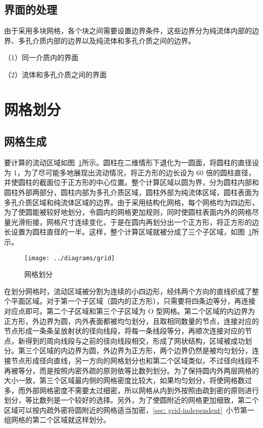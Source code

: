 \subsection{界面的处理}

由于采用多块网格，各个块之间需要设置边界条件，这些边界分为纯流体内部的边界、多孔介质内部的边界以及纯流体和多孔介质之间的边界。

（1）同一介质内的界面

（2）流体和多孔介质之间的界面

\section{网格划分}

\subsection{网格生成}

要计算的流动区域如图~\ref{fig: grid}所示。圆柱在二维情形下退化为一圆面，将圆柱的直径设为 1，为了尽可能多地展现出流动情况，将正方形的边长设为 60 倍的圆柱直径，并使圆柱的截面位于正方形的中心位置。整个计算区域以圆为界，分为圆柱内部和圆柱外部两部分，圆柱内部为多孔介质区域，圆柱外部为纯流体区域，圆柱表面为多孔介质区域和纯流体区域的边界。由于采用结构化网格，每个网格均为四边形，为了使圆能被较好地划分，令圆内的网格更加规则，同时使圆柱表面内外的网格尽量光滑衔接，网格尺寸连续变化，于是在圆内再划分出一个正方形，将正方形的边长设置为圆柱直径的一半。这样，整个计算区域就被分成了三个子区域，如图~\ref{fig: grid}所示。

\begin{figure}
	\centering
	\texttt{[image: ../diagrams/grid]}
	\caption{网格划分}\label{fig: grid}
\end{figure}

在划分网格时，流动区域被分割为连续的小四边形，经纬两个方向的直线织成了整个平面区域。对于第一个子区域（圆内的正方形），只需要将四条边等分，再连接对应点即可。第二个子区域和第三个子区域为 O 型网格。第二个区域的内边界为正方形，外边界为圆，内外表面都被均匀划分，且取相同数量的节点，连接对应的节点形成一条条呈放射状的径向线段，将每一条线段等分，再顺次连接对应的节点，新得到的周向线段与之前的径向线段相交，形成了网状结构，区域被成功划分。第三个区域的内边界为圆，外边界为正方形，两个边界仍然是被均匀划分，连接节点形成径向直线，另一方向的网格划分也和第二个区域类似，不过径向线段不再被等分，而是按照内密外疏的原则依等比数列划分。为了保持圆内外两层网格的大小一致，第三个区域最内侧的网格密度比较大，如果均匀划分，将使网格数过多，而外部网格密度不需要太过细密，所以网格从内到外按照由疏到密的原则进行划分，等比数列是一个较好的选择。另外，为了使圆附近的网格更加细致，第二个区域可以按内疏外密将圆附近的网格适当加密，\ref{sec: grid-independent}~小节第一组网格的第二个区域就这样划分。

